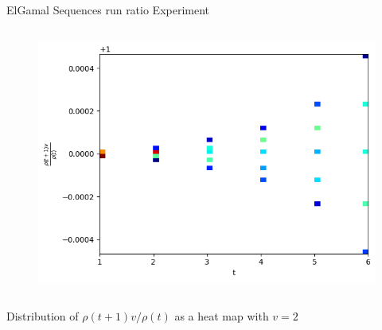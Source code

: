 \begin{frame}{ElGamal Sequences run ratio Experiment}
\begin{columns}
\begin{column}{0.45\textwidth}
\begin{figure}
                \includegraphics[width=\textwidth]{figures/v2AndvisGenNormalizedrunratio.png}
            \end{figure}
        \end{column}
    \end{columns}
    \begin{center}
                Distribution of $\rho(t+1)v/\rho(t)$ as a heat map with $v = 2$
    \end{center}
\end{frame}

